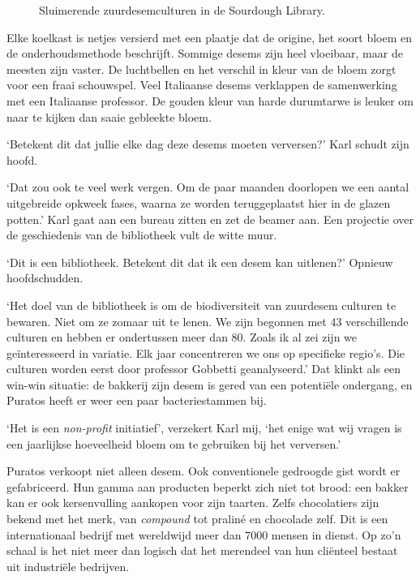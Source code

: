 \documentclass[
  11pt,
  dutch,
]{memoir}
\newcommand{\adjustimg}{%
  \checkoddpage%
  \ifoddpage\hspace*{\dimexpr\evensidemargin-\oddsidemargin}\else\hspace*{-\dimexpr\evensidemargin-\oddsidemargin}\fi%
}
\newcommand{\centerimg}[2][width=\textwidth]{%
  \makebox[\textwidth]{\adjustimg\texttt{[image: \#2]}}%
}
\begin{document}
\begin{figure}
    \mbox{} \par
    \noindent\centerimg[width=\paperwidth]{img/bw/library.jpg}
    \caption{Sluimerende zuurdesemculturen in de Sourdough Library.}
\end{figure}

Elke koelkast is netjes versierd met een plaatje dat de origine, het
soort bloem en de onderhoudsmethode beschrijft. Sommige desems zijn heel
vloeibaar, maar de meesten zijn vaster. De luchtbellen en het verschil
in kleur van de bloem zorgt voor een fraai schouwspel. Veel Italiaanse
desems verklappen de samenwerking met een Italiaanse professor. De
gouden kleur van harde durumtarwe is leuker om naar te kijken dan saaie
gebleekte bloem.

`Betekent dit dat jullie elke dag deze desems moeten verversen?' Karl
schudt zijn hoofd.

`Dat zou ook te veel werk vergen. Om de paar maanden doorlopen we een
aantal uitgebreide opkweek fases, waarna ze worden teruggeplaatst hier
in de glazen potten.' Karl gaat aan een bureau zitten en zet de beamer
aan. Een projectie over de geschiedenis van de bibliotheek vult de witte
muur.

`Dit is een bibliotheek. Betekent dit dat ik een desem kan uitlenen?'
Opnieuw hoofdschudden.

`Het doel van de bibliotheek is om de biodiversiteit van zuurdesem
culturen te bewaren. Niet om ze zomaar uit te lenen. We zijn begonnen
met 43 verschillende culturen en hebben er ondertussen meer dan 80.
Zoals ik al zei zijn we geïnteresseerd in variatie. Elk jaar
concentreren we ons op specifieke regio's. Die culturen worden eerst
door professor Gobbetti geanalyseerd.' Dat klinkt als een win-win
situatie: de bakkerij zijn desem is gered van een potentiële ondergang,
en Puratos heeft er weer een paar bacteriestammen bij.

`Het is een \emph{non-profit} initiatief', verzekert Karl mij, `het
enige wat wij vragen is een jaarlijkse hoeveelheid bloem om te gebruiken
bij het verversen.'

Puratos verkoopt niet alleen desem. Ook conventionele gedroogde gist
wordt er gefabriceerd. Hun gamma aan producten beperkt zich niet tot
brood: een bakker kan er ook kersenvulling aankopen voor zijn taarten.
Zelfs chocolatiers zijn bekend met het merk, van \emph{compound} tot
praliné en chocolade zelf. Dit is een internationaal bedrijf met
wereldwijd meer dan 7000 mensen in dienst. Op zo'n schaal is het niet
meer dan logisch dat het merendeel van hun cliënteel bestaat uit
industriële bedrijven.
\end{document}
